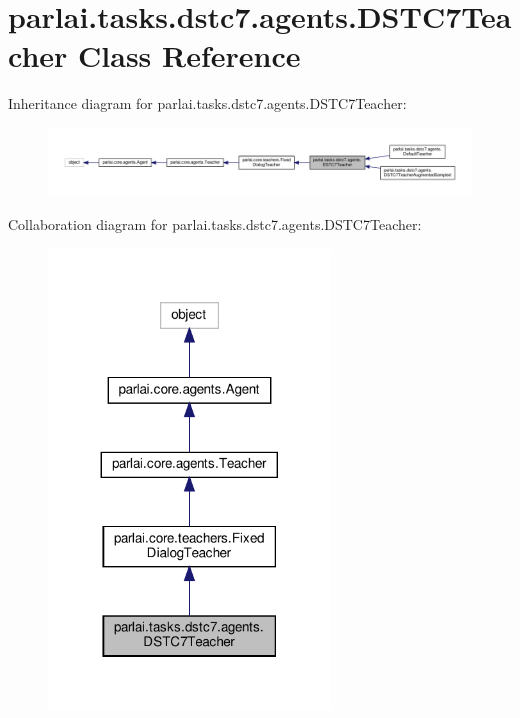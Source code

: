 \hypertarget{classparlai_1_1tasks_1_1dstc7_1_1agents_1_1DSTC7Teacher}{}\section{parlai.\+tasks.\+dstc7.\+agents.\+D\+S\+T\+C7\+Teacher Class Reference}
\label{classparlai_1_1tasks_1_1dstc7_1_1agents_1_1DSTC7Teacher}


Inheritance diagram for parlai.\+tasks.\+dstc7.\+agents.\+D\+S\+T\+C7\+Teacher\+:
\nopagebreak
\begin{figure}[H]
\begin{center}
\leavevmode
\includegraphics[width=350pt]{d6/dd5/classparlai_1_1tasks_1_1dstc7_1_1agents_1_1DSTC7Teacher__inherit__graph}
\end{center}
\end{figure}


Collaboration diagram for parlai.\+tasks.\+dstc7.\+agents.\+D\+S\+T\+C7\+Teacher\+:
\nopagebreak
\begin{figure}[H]
\begin{center}
\leavevmode
\includegraphics[width=212pt]{df/d5b/classparlai_1_1tasks_1_1dstc7_1_1agents_1_1DSTC7Teacher__coll__graph}
\end{center}
\end{figure}
